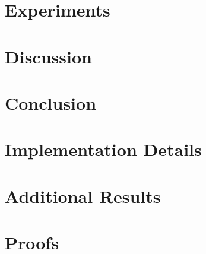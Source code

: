 \documentclass[11pt]{article}
\begin{document}
\section{Experiments}
\label{sec:experiments}


\section{Discussion}
\label{sec:discussion}


\section{Conclusion}
\label{sec:conclusion}






\appendix

\section{Implementation Details}
\label{app:implementation}

\section{Additional Results}
\label{app:results}

\section{Proofs}
\label{app:proofs}
\end{document}
